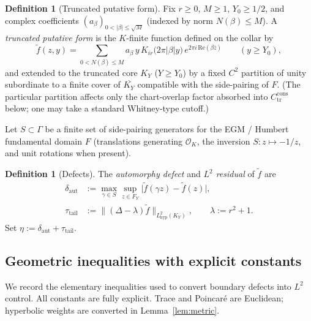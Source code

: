 \documentclass[11pt]{amsart}
\theoremstyle{definition}
\newtheorem{definition}[theorem]{Definition}
\newcommand{\OK}{\mathcal{O}_K}
\newcommand{\abs}[1]{\lvert#1\rvert}
\newcommand{\norm}[1]{\lVert#1\rVert}
\begin{document}
\begin{definition}[Truncated putative form]
\label{def:putative}
Fix $r\ge 0$, $M\ge 1$, $Y_0\ge 1/2$, and complex coefficients
$(a_\beta)_{0<\abs{\beta}\le\sqrt{M}}$ (indexed by norm $N(\beta)\le M$).
A \emph{truncated putative form} is the $K$-finite function defined on the
collar by
\begin{equation}
\label{eq:putative}
  \widetilde f(z,y)
  =
  \sum_{0<N(\beta)\le M}
  a_\beta\,
  y\,K_{ir}\bigl(2\pi\abs{\beta}y\bigr)\,
  e^{2\pi i\,\mathrm{Re}(\beta\overline{z})}
  \qquad(y\ge Y_0),
\end{equation}
and extended to the truncated core $K_Y$ ($Y\ge Y_0$) by a fixed $C^2$
partition of unity subordinate to a finite cover of $\overline{K_Y}$
compatible with the side-pairing of $F$.  (The particular partition
affects only the chart-overlap factor absorbed into $C_{\mathrm{tr}}^{\mathrm{cons}}$
below; one may take a standard Whitney-type cutoff.)
\end{definition}

Let $S\subset\Gamma$ be a finite set of side-pairing generators for the
EGM / Humbert fundamental domain $F$ (translations generating $\OK$, the
inversion $S:z\mapsto -1/z$, and unit rotations when present).

\begin{definition}[Defects]
\label{def:defects}
The \emph{automorphy defect} and \emph{$L^2$ residual} of $\widetilde f$
are
\begin{align}
  \delta_{\mathrm{aut}}
  &:=
  \max_{\gamma\in S}
  \sup_{z\in F_Y}
  \abs{\widetilde f(\gamma z)-\widetilde f(z)},
  \label{eq:deltaaut}\\
  \tau_{\mathrm{tail}}
  &:=
  \norm{(\Delta-\lambda)\widetilde f}_{L^2_{\mathrm{hyp}}(K_Y)},
  \qquad\lambda:=r^2+1.
  \label{eq:tautil}
\end{align}
Set $\eta:=\delta_{\mathrm{aut}}+\tau_{\mathrm{tail}}$.
\end{definition}

\subsection{Geometric inequalities with explicit constants}

We record the elementary inequalities used to convert boundary defects
into $L^2$ control.  All constants are fully explicit.  Trace and
Poincar\'e are Euclidean; hyperbolic weights are converted in
Lemma~\ref{lem:metric}.
\end{document}
